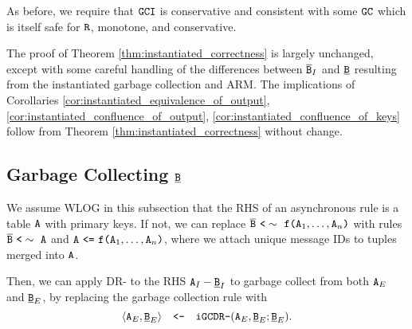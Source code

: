 \documentclass{article}
\numberwithin{equation}{section}
\renewcommand{\tt}[1]{\ifmmode\text{\texttt{#1}}\else\texttt{#1}\fi}
\begin{document}
As before, we require that $\tt{GCI}$ is conservative and consistent with some $\tt{GC}$ which is itself safe for $\tt{R}$, monotone, and conservative.

The proof of Theorem \ref{thm:instantiated_correctness} is largely unchanged, except with some careful handling of the differences between $\overline{\tt{B}}_I$ and $\underline{\tt{B}}$ resulting from the instantiated garbage collection and ARM.
The implications of Corollaries \ref{cor:instantiated_equivalence_of_output}, \ref{cor:instantiated_confluence_of_output}, \ref{cor:instantiated_confluence_of_keys} follow from Theorem \ref{thm:instantiated_correctness} without change.



\subsection{Garbage Collecting $\underline{\tt{B}}$}
We assume WLOG in this subsection that the RHS of an asynchronous rule is a table $\tt{A}$ with primary keys.
If not, we can replace $\overline{\tt{B}} ~\tt{<}\sim~ \tt{f}\tt{(}\tt{A}_1, \dots, \tt{A}_n\tt{)}$ with rules $\overline{\tt{B}} ~\tt{<}\sim~ \tt{A}$ and $\tt{A} ~\tt{<=}~ \tt{f}\tt{(}\tt{A}_1, \dots, \tt{A}_n\tt{)}$, where we attach unique message IDs to tuples merged into $\tt{A}$.

Then, we can apply DR- to the RHS $\tt{A}_I - \underline{\tt{B}}_I$ to garbage collect from both $\tt{A}_E$ and $\underline{\tt{B}}_E$, by replacing the garbage collection rule with
\[
\langle \tt{A}_E, \underline{\tt{B}}_E \rangle \quad\tt{<-}\quad \tt{iGCDR-}(\tt{A}_E, \underline{\tt{B}}_E; \underline{\tt{B}}_E).
\]









\end{document}
